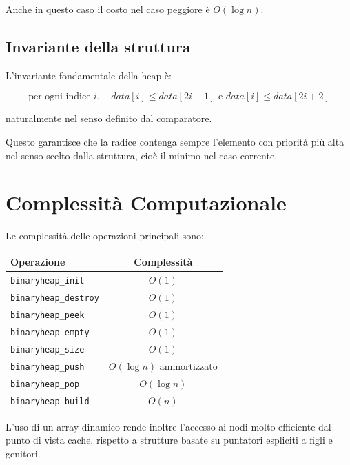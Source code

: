 \documentclass[a4paper,12pt]{article}
\begin{document}
Anche in questo caso il costo nel caso peggiore è \(O(\log n)\).

\subsection{Invariante della struttura}

L'invariante fondamentale della heap è:

\[
    \text{per ogni indice } i, \quad data[i] \leq data[2i+1] \text{ e } data[i] \leq data[2i+2]
\]

naturalmente nel senso definito dal comparatore.

Questo garantisce che la radice contenga sempre l'elemento con priorità più alta nel senso scelto dalla struttura, cioè il minimo nel caso corrente.

\section{Complessità Computazionale}

Le complessità delle operazioni principali sono:

\begin{center}
    \begin{tabular}{|l|c|}
        \hline
        Operazione                   & Complessità                \\
        \hline
        \texttt{binaryheap\_init}    & \(O(1)\)                   \\
        \texttt{binaryheap\_destroy} & \(O(1)\)                   \\
        \texttt{binaryheap\_peek}    & \(O(1)\)                   \\
        \texttt{binaryheap\_empty}   & \(O(1)\)                   \\
        \texttt{binaryheap\_size}    & \(O(1)\)                   \\
        \texttt{binaryheap\_push}    & \(O(\log n)\) ammortizzato \\
        \texttt{binaryheap\_pop}     & \(O(\log n)\)              \\
        \texttt{binaryheap\_build}   & \(O(n)\)                   \\
        \hline
    \end{tabular}
\end{center}

L'uso di un array dinamico rende inoltre l'accesso ai nodi molto efficiente dal punto di vista cache, rispetto a strutture basate su puntatori espliciti a figli e genitori.
\end{document}
